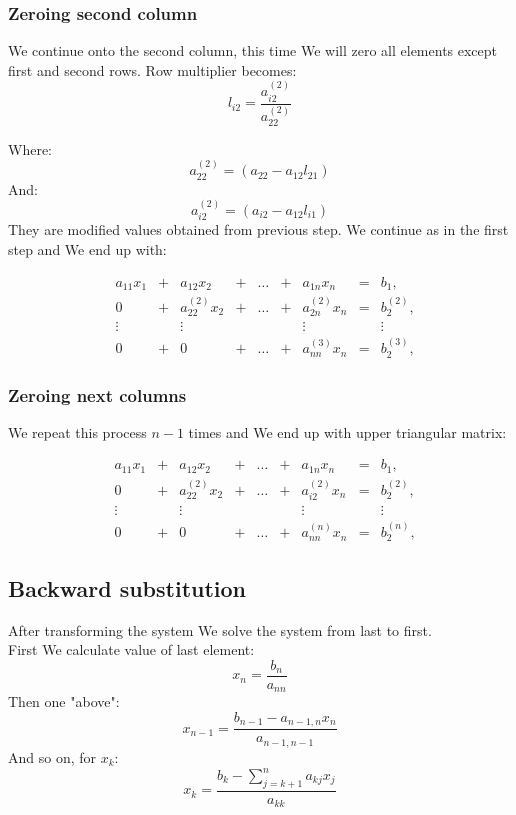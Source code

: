 \documentclass[12pt]{report}
\begin{document}
\subsubsection{Zeroing second column}
We continue onto the second column, this time We will zero all elements except first and second rows.
Row multiplier becomes:
\[ l_{i2} = \frac{ a_{i2}^{(2)} }{ a_{22}^{(2)} } \]

Where:
\[ a_{22}^{(2)} = (a_{22} - a_{12}l_{21}) \]
And:
\[ a_{i2}^{(2)} = (a_{i2} - a_{12}l_{i1}) \]
They are modified values obtained from previous step.
We continue as in the first step and We end up with:

\[
\begin{matrix}

&a_{11}x_1 &{}+&a_{12}x_2&+&\dots&+&a_{1n}x_n &=&b_1,\\

&0 &{}+& a_{22}^{(2)}x_2&{}+&\dots&{}+& a_{2n}^{(2)}x_n &=&b_2^{(2)},\\

&\vdots    &&\vdots      & &     & &  \vdots  & &\vdots\\

&0 &{}+& 0 &{}+&\dots&{}+& a_{nn}^{(3)}x_n &=&b_2^{(3)},

\end{matrix}
\]

\subsubsection{Zeroing next columns}
We repeat this process $n-1$ times and We end up with upper triangular matrix:

\[
\begin{matrix}

&a_{11}x_1 &{}+&a_{12}x_2&+&\dots&+&a_{1n}x_n &=&b_1,\\

&0 &{}+& a_{22}^{(2)}x_2&{}+&\dots&{}+& a_{i2}^{(2)}x_n &=&b_2^{(2)},\\

&\vdots    &&\vdots      & &     & &  \vdots  & &\vdots\\

&0 &{}+& 0 &{}+&\dots&{}+& a_{nn}^{(n)}x_n &=&b_2^{(n)},

\end{matrix}
\]

\subsection{Backward substitution}
After transforming the system We solve the system from last to first. \\
First We calculate value of last element:
\[ x_n = \frac{b_n}{a_{nn}} \]
Then one "above":
\[ x_{n-1} = \frac{ b_{n-1} - a_{n-1, n}x_n}{a_{n-1, n-1}} \]
And so on, for $x_k$:
\[ x_{k} = \frac{b_k - \sum_{j = k + 1}^n a_{kj}x_j}{a_{kk}} \]
\end{document}
